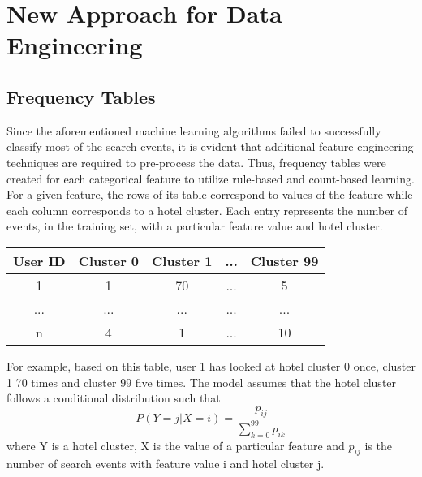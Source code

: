 \documentclass[12pt]{report}
\begin{document}
\section{New Approach for Data Engineering}
\subsection{Frequency Tables}
Since the aforementioned machine learning algorithms failed to successfully classify most of the search events, it is evident that additional feature engineering techniques are required to pre-process the data. Thus, frequency tables were created for each categorical feature to utilize rule-based and count-based learning. For a given feature, the rows of its table correspond to values of the feature while each column corresponds to a hotel cluster. Each entry represents the number of events, in the training set, with a particular feature value and hotel cluster.\\

\begin{center}
	\begin{tabular}{|c|c|c|c|c|}
  		\hline
		 User ID& Cluster 0& Cluster 1& ...& Cluster 99 \\
		  \hline \hline
		 1  & 1 & 70& ...& 5 \\\hline
		 ...  & ... & ...& ...& ... \\\hline
		 n  & 4& 1& ...& 10 \\\hline
	\end{tabular}
\end{center}

For example, based on this table, user 1 has looked at hotel cluster 0 once, cluster 1 70 times and cluster 99 five times. The model assumes that the hotel cluster follows a conditional distribution such that 
\[P(Y=j|X=i)=\frac{p_{ij}}{\sum_{k=0}^{99} p_{ik}}\] 
where Y is a hotel cluster, X is the value of a particular feature and $p_{ij}$ is the number of search events with feature value i and hotel cluster j.
\end{document}
